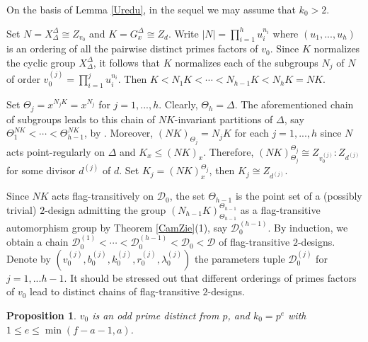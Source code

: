 \documentclass[a4paper,twopage,reqno,12pt]{amsart}
\newtheorem{proposition}[theorem]{Proposition}
\theoremstyle{definition}
\numberwithin{equation}{section}
\renewcommand{\leq}{\leqslant}
\begin{document}
\bigskip

On the basis of Lemma \ref{Uredu}, in the sequel we may assume that $k_{0}>2$. 

Set $N=X_{\Delta }^{\Delta }\cong Z_{v_{0}}$ and $K=G_{x}^{\Delta }\cong
Z_{d}$. Write $\left\vert N\right\vert =\prod_{i=1}^{h}u_{i}^{n_{i}}$ where $%
\left( u_{1},...,u_{h}\right) $ is an ordering of all the pairwise distinct
primes factors of $v_{0}$. Since $K$ normalizes the cyclic group $X_{\Delta
}^{\Delta }$, it follows that $K$ normalizes each of the subgroups $N_{j}$
of $N$ of order $v_{0}^{(j)}=\prod_{i=1}^{j}u_{i}^{n_{i}}$. Then $%
K<N_{1}K<\cdots <N_{h-1}K<N_{h}K=NK$. 

Set $\Theta _{j}=x^{N_{j}K}=x^{N_{j}}$
for $j=1,...,h$. Clearly, $\Theta _{h}=\Delta $. The aforementioned chain of
subgroups leads to this chain of $NK$-invariant partitions of $\Delta $, say 
$\Theta _{1}^{NK}<\cdots <\Theta _{h-1}^{NK}$, by \cite[Theorem 1.5A]{DM}.
Moreover, $(NK)_{\Theta _{j}}=N_{j}K$ for each $j=1,...,h$ since $N$ acts point-regularly on $\Delta$ and $K_{x} \leq (NK)_{x}$. Therefore, $(NK)_{\Theta _{j}}^{\Theta _{j}}\cong Z_{v_{0}^{(j)}}:Z_{d^{(j)}}$ for some divisor $d^{(j)}$ of $d$. Set $K_{j}=(NK)_{x}^{\Theta _{j}}$, then $K_{j}\cong Z_{d^{(j)}}$. 
 
Since $NK$ acts flag-transitively on $\mathcal{D}_{0}$, the set $%
\Theta _{h-1}$ is the point set of a (possibly trivial) $2$-design admitting the group $%
(N_{h-1}K)_{\Theta _{h-1}}^{\Theta _{h-1}}$ as a flag-transitive automorphism group by Theorem \ref{CamZie}(1), say $\mathcal{D}_{0}^{(h-1)}$. By induction, we obtain
a chain $\mathcal{D}_{0}^{(1)}<\cdots <\mathcal{D}_{0}^{(h-1)}<\mathcal{D}%
_{0}<\mathcal{D}$ of flag-transitive $2$-designs. Denote by $%
(v_{0}^{(j)},b_{0}^{(j)},k_{0}^{(j)}, r_{0}^{(j)},\lambda _{0}^{(j)})$ the
parameters tuple $\mathcal{D}_{0}^{(j)}$ for $j=1,...h-1$. It should be
stressed out that different orderings of primes factors of $v_{0}$ lead to
distinct chains of flag-transitive $2$-designs.

\bigskip

\begin{proposition}
\label{v0prime}$v_{0}$ is an odd prime distinct from $p$, and $k_{0}=p^{e}$ with $1\leq e\leq
\min (f-a-1,a)$.
\end{proposition}
\end{document}
